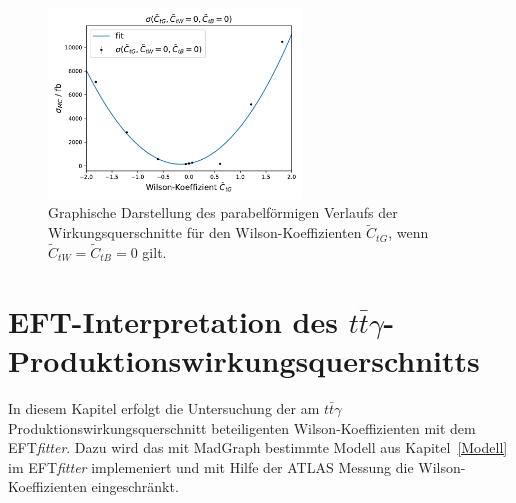 \begin{figure}
  \centering
  \includegraphics[width=0.6\textwidth]{Plots/combi_plot_tG.pdf}
  \caption{Graphische Darstellung des parabelförmigen Verlaufs der Wirkungsquerschnitte für den Wilson-Koeffizienten $\tilde{C}_{tG}$, wenn $\tilde{C}_{tW}=\tilde{C}_{tB}=0$ gilt.}
  \label{fig:WtG}
\end{figure}
%
%
\chapter{EFT-Interpretation des \texorpdfstring {$t\bar{t}\gamma$}{math}-Produktionswirkungsquerschnitts}
In diesem Kapitel erfolgt die Untersuchung der am $t\bar{t}\gamma$ Produktionswirkungsquerschnitt beteiligenten Wilson-Koeffizienten mit dem EFT\textit{fitter}. Dazu wird das mit MadGraph bestimmte Modell aus Kapitel~\ref{Modell} im EFT\textit{fitter} implemeniert und mit Hilfe der ATLAS Messung die Wilson-Koeffizienten eingeschränkt.


